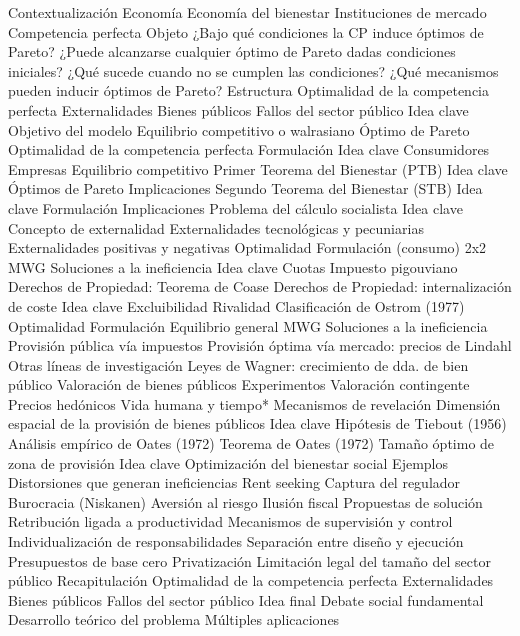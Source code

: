 \documentclass{nuevotema}
\begin{document}
\begin{esquema}[enumerate]
	\1[] 
		\2 Contextualización
			\3 Economía
			\3 Economía del bienestar
			\3 Instituciones de mercado
			\3 Competencia perfecta
		\2 Objeto
			\3 ¿Bajo qué condiciones la CP induce óptimos de Pareto?
			\3 ¿Puede alcanzarse cualquier óptimo de Pareto dadas condiciones iniciales?
			\3 ¿Qué sucede cuando no se cumplen las condiciones?
			\3 ¿Qué mecanismos pueden inducir óptimos de Pareto?
		\2 Estructura
			\3 Optimalidad de la competencia perfecta
			\3 Externalidades
			\3 Bienes públicos
			\3 Fallos del sector público
	\1 
		\2 Idea clave
			\3 Objetivo del modelo
			\3 Equilibrio competitivo o walrasiano
			\3 Óptimo de Pareto
			\3 Optimalidad de la competencia perfecta
		\2 Formulación
			\3 Idea clave
			\3 Consumidores
			\3 Empresas
			\3 Equilibrio competitivo
		\2 Primer Teorema del Bienestar (PTB)
			\3 Idea clave
			\3 Óptimos de Pareto
			\3 Implicaciones
		\2 Segundo Teorema del Bienestar (STB)
			\3 Idea clave
			\3 Formulación
			\3 Implicaciones
			\3 Problema del cálculo socialista
	\1 
		\2 Idea clave
			\3 Concepto de externalidad
			\3 Externalidades tecnológicas y pecuniarias
			\3 Externalidades positivas y negativas
			\3 Optimalidad
		\2 Formulación (consumo)
			\3 2x2
			\3 MWG
		\2 Soluciones a la ineficiencia
			\3 Idea clave
			\3 Cuotas
			\3 Impuesto pigouviano
			\3 Derechos de Propiedad: Teorema de Coase
			\3 Derechos de Propiedad: internalización de coste
	\1 
		\2 Idea clave
			\3 Excluibilidad
			\3 Rivalidad
			\3 Clasificación de Ostrom (1977)
			\3 Optimalidad
		\2 Formulación
			\3 Equilibrio general
			\3 MWG
		\2 Soluciones a la ineficiencia
			\3 Provisión pública vía impuestos
			\3 Provisión óptima vía mercado: precios de Lindahl
			\3 Otras líneas de investigación
			\3 Leyes de Wagner: crecimiento de dda. de bien público
		\2 Valoración de bienes públicos
			\3 Experimentos
			\3 Valoración contingente
			\3 Precios hedónicos
			\3 Vida humana y tiempo*
			\3 Mecanismos de revelación
		\2 Dimensión espacial de la provisión de bienes públicos
			\3 Idea clave
			\3 Hipótesis de Tiebout (1956)
			\3 Análisis empírico de Oates (1972)
			\3 Teorema de Oates (1972)
			\3 Tamaño óptimo de zona de provisión
	\1 
		\2 Idea clave
			\3 Optimización del bienestar social
		\2 Ejemplos
			\3 Distorsiones que generan ineficiencias
			\3 Rent seeking
			\3 Captura del regulador
			\3 Burocracia (Niskanen)
			\3 Aversión al riesgo
			\3 Ilusión fiscal
		\2 Propuestas de solución
			\3 Retribución ligada a productividad
			\3 Mecanismos de supervisión y control
			\3 Individualización de responsabilidades
			\3 Separación entre diseño y ejecución
			\3 Presupuestos de base cero
			\3 Privatización
			\3 Limitación legal del tamaño del sector público
	\1[] 
		\2 Recapitulación
			\3 Optimalidad de la competencia perfecta
			\3 Externalidades
			\3 Bienes públicos
			\3 Fallos del sector público
		\2 Idea final
			\3 Debate social fundamental
			\3 Desarrollo teórico del problema
			\3 Múltiples aplicaciones

\end{esquema}
\end{document}
